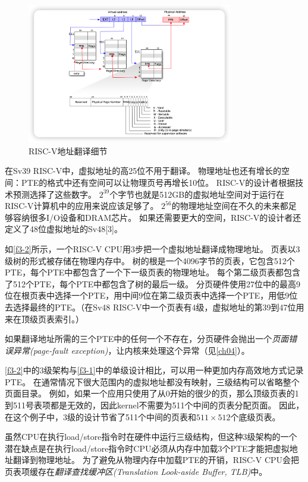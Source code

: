 \begin{figure}[htbp]
    \centering
    \includegraphics[width=0.8\textwidth]{../imgs/f3-2.png}
    \caption{RISC-V地址翻译细节}
    \label{f3-2}
\end{figure}

在Sv39 RISC-V中，虚拟地址的高25位不用于翻译。
物理地址也还有增长的空间：PTE的格式中还有空间可以让物理页号再增长10位。
RISC-V的设计者根据技术预测选择了这些数字。
$2^{39}$个字节也就是512GB的虚拟地址空间对于运行在RISC-V计算机中的应用来说应该足够了。
$2^{56}$的物理地址空间在不久的未来都足够容纳很多I/O设备和DRAM芯片。
如果还需要更大的空间，RISC-V的设计者还定义了48位虚拟地址的Sv48[3]。

如\autoref{f3-2}所示，一个RISC-V CPU用3步把一个虚拟地址翻译成物理地址。
页表以3级树的形式被存储在物理内存中。
树的根是一个4096字节的页表，它包含512个PTE，每个PTE中都包含了一个下一级页表的物理地址。
每个第二级页表都包含了512个PTE，每个PTE中都包含了树的最后一级。
分页硬件使用27位中的最高9位在根页表中选择一个PTE，用中间9位在第二级页表中选择一个PTE，用低9位去选择最终的PTE。（在Sv48 RISC-V中一个页表有4级，虚拟地址的第39到47位用来在顶级页表索引。）

如果翻译地址所需的三个PTE中的任何一个不存在，分页硬件会抛出一个\emph{页面错误异常(page-fault exception)}，让内核来处理这个异常（见\autoref{ch04}）。

\autoref{f3-2}中的3级架构与\autoref{f3-1}中的单级设计相比，可以用一种更加内存高效地方式记录PTE。
在通常情况下很大范围内的虚拟地址都没有映射，三级结构可以省略整个页面目录。
例如，如果一个应用只使用了从0开始的很少的页，那么顶级页表的1到511号表项都是无效的，因此kernel不需要为511个中间的页表分配页面。
因此，在这个例子中，3级的设计节省了511个中间的页表和$511 \times 512$个底级页表。

虽然CPU在执行load/store指令时在硬件中运行三级结构，但这种3级架构的一个潜在缺点是在执行load/store指令时CPU必须从内存中加载3个PTE才能把虚拟地址翻译到物理地址。
为了避免从物理内存中加载PTE的开销，RISC-V CPU会把页表项缓存在\emph{翻译查找缓冲区(Translation Look-aside Buffer, TLB)}中。

